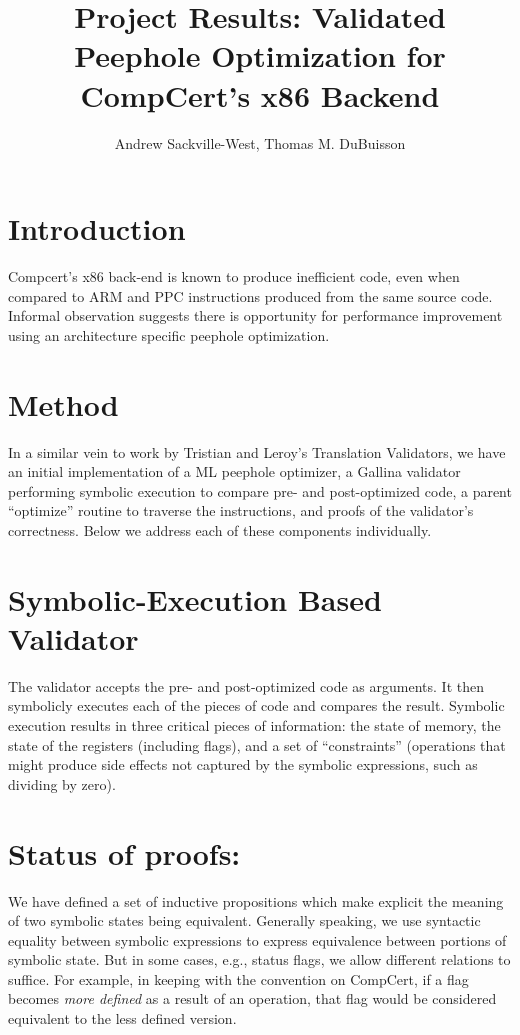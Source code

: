 \documentclass{article}
\title{Project Results: Validated Peephole Optimization for CompCert's x86 Backend}
\author{Andrew Sackville-West, Thomas M. DuBuisson}
\begin{document}
\maketitle

\section{Introduction}

Compcert's x86 back-end is known to produce inefficient code, even
when compared to ARM and PPC instructions produced from the same
source code.  Informal observation suggests there is opportunity for
performance improvement using an architecture specific peephole
optimization.

\section{Method}

In a similar vein to work by Tristian and Leroy's Translation
Validators, we have an initial implementation of a ML peephole
optimizer, a Gallina validator performing symbolic execution to
compare pre- and post-optimized code, a parent ``optimize'' routine to
traverse the instructions, and proofs of the validator's correctness.
Below we address each of these components individually.

\section{Symbolic-Execution Based Validator}

The validator accepts the pre- and post-optimized code as arguments.
It then symbolicly executes each of the pieces of code and compares
the result.  Symbolic execution results in three critical pieces of
information: the state of memory, the state of the registers
(including flags), and a set of ``constraints'' (operations that might
produce side effects not captured by the symbolic expressions, such as
dividing by zero).

\section{Status of proofs: }
We have defined a set of inductive propositions which make explicit
the meaning of two symbolic states being equivalent. Generally
speaking, we use syntactic equality between symbolic expressions to
express equivalence between portions of symbolic state. But
in some cases, e.g., status flags, we allow different relations to
suffice. For example, in keeping with the convention on CompCert, if a
flag becomes {\it more defined} as a result of an operation, that flag
would be considered equivalent to the less defined version. 
\end{document}
